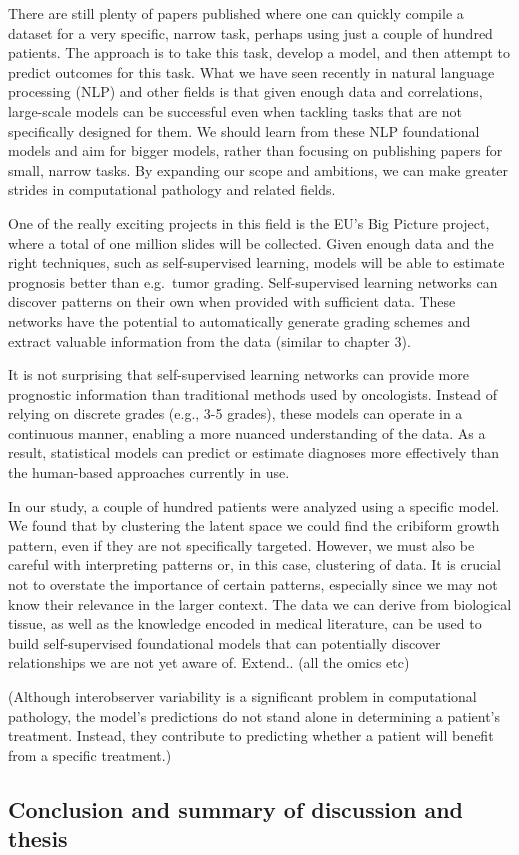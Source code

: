 \documentclass[
  12pt,
  a5,margin=2cmpaper,
]{article}
\begin{document}
There are still plenty of papers published where one can quickly compile
a dataset for a very specific, narrow task, perhaps using just a couple
of hundred patients. The approach is to take this task, develop a model,
and then attempt to predict outcomes for this task. What we have seen
recently in natural language processing (NLP) and other fields is that
given enough data and correlations, large-scale models can be successful
even when tackling tasks that are not specifically designed for them. We
should learn from these NLP foundational models and aim for bigger
models, rather than focusing on publishing papers for small, narrow
tasks. By expanding our scope and ambitions, we can make greater strides
in computational pathology and related fields.

One of the really exciting projects in this field is the EU's Big
Picture project, where a total of one million slides will be collected.
Given enough data and the right techniques, such as self-supervised
learning, models will be able to estimate prognosis better than
e.g.~tumor grading. Self-supervised learning networks can discover
patterns on their own when provided with sufficient data. These networks
have the potential to automatically generate grading schemes and extract
valuable information from the data (similar to chapter 3).

It is not surprising that self-supervised learning networks can provide
more prognostic information than traditional methods used by
oncologists. Instead of relying on discrete grades (e.g., 3-5 grades),
these models can operate in a continuous manner, enabling a more nuanced
understanding of the data. As a result, statistical models can predict
or estimate diagnoses more effectively than the human-based approaches
currently in use.

In our study, a couple of hundred patients were analyzed using a
specific model. We found that by clustering the latent space we could
find the cribiform growth pattern, even if they are not specifically
targeted. However, we must also be careful with interpreting patterns
or, in this case, clustering of data. It is crucial not to overstate the
importance of certain patterns, especially since we may not know their
relevance in the larger context. The data we can derive from biological
tissue, as well as the knowledge encoded in medical literature, can be
used to build self-supervised foundational models that can potentially
discover relationships we are not yet aware of. Extend.. (all the omics
etc)

(Although interobserver variability is a significant problem in
computational pathology, the model's predictions do not stand alone in
determining a patient's treatment. Instead, they contribute to
predicting whether a patient will benefit from a specific treatment.)

\hypertarget{conclusion-and-summary-of-discussion-and-thesis}{%
\subsection{Conclusion and summary of discussion and
thesis}\label{conclusion-and-summary-of-discussion-and-thesis}}
\end{document}
